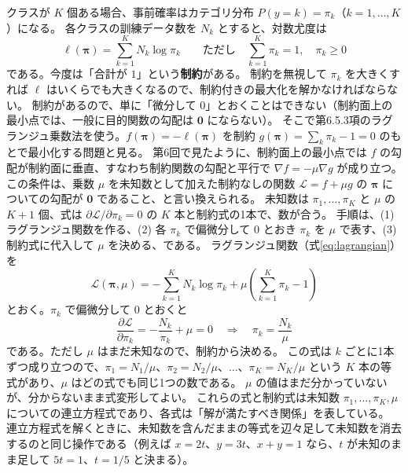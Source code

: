 クラスが $K$ 個ある場合、事前確率はカテゴリ分布 $P(y = k) = \pi_k$（$k = 1, \ldots, K$）になる。
各クラスの訓練データ数を $N_k$ とすると、対数尤度は
\begin{equation}
  \ell(\bm{\pi}) = \sum_{k=1}^K N_k \log \pi_k
  \qquad \text{ただし} \quad \sum_{k=1}^K \pi_k = 1,\quad \pi_k \geq 0
  \label{eq:ch8-cat-loglik}
\end{equation}
である。今度は「合計が $1$」という\textbf{制約}がある。
制約を無視して $\pi_k$ を大きくすれば $\ell$ はいくらでも大きくなるので、制約付きの最大化を解かなければならない。
制約があるので、単に「微分して $0$」とおくことはできない（制約面上の最小点では、一般に目的関数の勾配は $\bm{0}$ にならない）。
そこで第6.5.3項のラグランジュ乗数法を使う。$f(\bm{\pi}) = -\ell(\bm{\pi})$ を制約 $g(\bm{\pi}) = \sum_k \pi_k - 1 = 0$ のもとで最小化する問題と見る。
第6回で見たように、制約面上の最小点では $f$ の勾配が制約面に垂直、すなわち制約関数の勾配と平行で $\nabla f = -\mu\nabla g$ が成り立つ。
この条件は、乗数 $\mu$ を未知数として加えた制約なしの関数 $\mathcal{L} = f + \mu g$ の $\bm{\pi}$ についての勾配が $\bm{0}$ であること、と言い換えられる。
未知数は $\pi_1, \ldots, \pi_K$ と $\mu$ の $K + 1$ 個、式は $\partial\mathcal{L}/\partial\pi_k = 0$ の $K$ 本と制約式の1本で、数が合う。
手順は、(1) ラグランジュ関数を作る、(2) 各 $\pi_k$ で偏微分して $0$ とおき $\pi_k$ を $\mu$ で表す、(3) 制約式に代入して $\mu$ を決める、である。
ラグランジュ関数（式\eqref{eq:lagrangian}）を
\begin{equation}
  \mathcal{L}(\bm{\pi}, \mu) = -\sum_{k=1}^K N_k \log \pi_k + \mu\left( \sum_{k=1}^K \pi_k - 1 \right)
  \label{eq:ch8-cat-lagrange}
\end{equation}
とおく。$\pi_k$ で偏微分して $0$ とおくと
\begin{equation*}
  \frac{\partial \mathcal{L}}{\partial \pi_k} = -\frac{N_k}{\pi_k} + \mu = 0
  \quad\Longrightarrow\quad
  \pi_k = \frac{N_k}{\mu}
\end{equation*}
である。ただし $\mu$ はまだ未知なので、制約から決める。
この式は $k$ ごとに1本ずつ成り立つので、$\pi_1 = N_1/\mu$、$\pi_2 = N_2/\mu$、$\ldots$、$\pi_K = N_K/\mu$ という $K$ 本の等式があり、$\mu$ はどの式でも同じ1つの数である。
$\mu$ の値はまだ分かっていないが、分からないまま式変形してよい。
これらの式と制約式は未知数 $\pi_1, \ldots, \pi_K, \mu$ についての連立方程式であり、各式は「解が満たすべき関係」を表している。
連立方程式を解くときに、未知数を含んだままの等式を辺々足して未知数を消去するのと同じ操作である（例えば $x = 2t$、$y = 3t$、$x + y = 1$ なら、$t$ が未知のまま足して $5t = 1$、$t = 1/5$ と決まる）。
